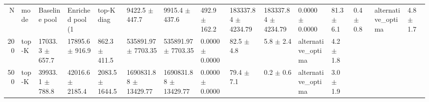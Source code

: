 \begin{tabular}{rlllllllllll}
\toprule
N & mode & Baseline pool & Enriched pool (1%
 & top-K diag & 9422.5 $\pm$ 447.7 & 9915.4 $\pm$ 437.6 & 492.9 $\pm$ 162.2 & 183337.84 $\pm$ 4234.79 & 183337.84 $\pm$ 4234.79 & 0.0000 $\pm$ 0.0000 & 81.3 $\pm$ 6.1 & 0.4 $\pm$ 0.8 & alternative_optima & 4.8 $\pm$ 1.7 \\
200 & top-K & 17033.3 $\pm$ 657.7 & 17895.6 $\pm$ 916.9 & 862.3 $\pm$ 411.5 & 535891.97 $\pm$ 7703.35 & 535891.97 $\pm$ 7703.35 & 0.0000 $\pm$ 0.0000 & 82.5 $\pm$ 4.8 & 5.8 $\pm$ 2.4 & alternative_optima & 4.2 $\pm$ 1.8 \\
500 & top-K & 39933.1 $\pm$ 788.8 & 42016.6 $\pm$ 2185.4 & 2083.5 $\pm$ 1644.5 & 1690831.88 $\pm$ 13429.77 & 1690831.88 $\pm$ 13429.77 & 0.0000 $\pm$ 0.0000 & 79.4 $\pm$ 7.1 & 0.2 $\pm$ 0.6 & alternative_optima & 3.0 $\pm$ 1.9 \\
\bottomrule
\end{tabular}
